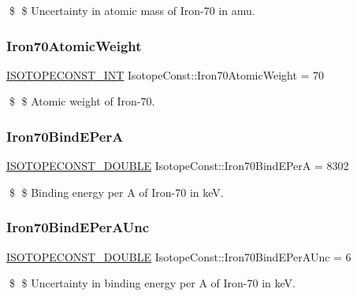 \$ \$ Uncertainty in atomic mass of Iron-\/70 in amu. \mbox{\label{group___isotope_const-_iron-_fe70_ga22c039acf1f59f51a91888324be638de}} 
\subsubsection{\texorpdfstring{Iron70\+Atomic\+Weight}{Iron70AtomicWeight}}
{\footnotesize\ttfamily \mbox{\hyperlink{group___isotope_const-_macros_ga5f18360b3e99483a35c32d789e62621c}{I\+S\+O\+T\+O\+P\+E\+C\+O\+N\+S\+T\+\_\+\+I\+NT}} Isotope\+Const\+::\+Iron70\+Atomic\+Weight = 70}

\$ \$ Atomic weight of Iron-\/70. \mbox{\label{group___isotope_const-_iron-_fe70_ga99aef27b1fc50687c4eff5a9c9ff33a4}} 
\subsubsection{\texorpdfstring{Iron70\+Bind\+E\+PerA}{Iron70BindEPerA}}
{\footnotesize\ttfamily \mbox{\hyperlink{group___isotope_const-_macros_ga8f45a7272ce02c0b4c65c44636ed719a}{I\+S\+O\+T\+O\+P\+E\+C\+O\+N\+S\+T\+\_\+\+D\+O\+U\+B\+LE}} Isotope\+Const\+::\+Iron70\+Bind\+E\+PerA = 8302}

\$ \$ Binding energy per A of Iron-\/70 in keV. \mbox{\label{group___isotope_const-_iron-_fe70_gaad0556a54254e959076c48faf182c096}} 
\subsubsection{\texorpdfstring{Iron70\+Bind\+E\+Per\+A\+Unc}{Iron70BindEPerAUnc}}
{\footnotesize\ttfamily \mbox{\hyperlink{group___isotope_const-_macros_ga8f45a7272ce02c0b4c65c44636ed719a}{I\+S\+O\+T\+O\+P\+E\+C\+O\+N\+S\+T\+\_\+\+D\+O\+U\+B\+LE}} Isotope\+Const\+::\+Iron70\+Bind\+E\+Per\+A\+Unc = 6}

\$ \$ Uncertainty in binding energy per A of Iron-\/70 in keV. \mbox{\label{group___isotope_const-_iron-_fe70_ga1e0a7b68f9030d7b27f6937cb492d42a}} 
